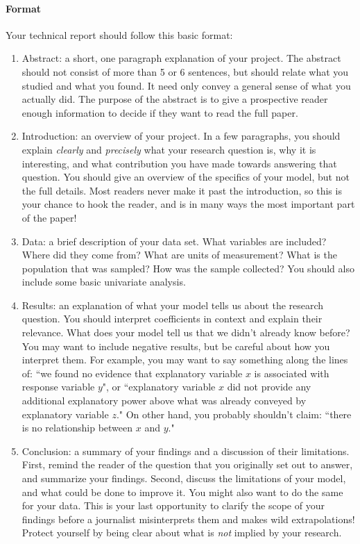 \documentclass[10pt]{article}
\begin{document}
\paragraph{Format}
Your technical report should follow this basic format:
	\begin{enumerate}
		\item Abstract: a short, one paragraph explanation of your project. The abstract should not consist of more than 5 or 6 sentences, but should relate what you studied and what you found. It need only convey a general sense of what you actually did. The purpose of the abstract is to give a prospective reader enough information to decide if they want to read the full paper. 
		\item Introduction: an overview of your project. In a few paragraphs, you should explain \emph{clearly} and \emph{precisely} what your research question is, why it is interesting, and what contribution you have made towards answering that question. You should give an overview of the specifics of your model, but not the full details. Most readers never make it past the introduction, so this is your chance to hook the reader, and is in many ways the most important part of the paper!
		\item Data: a brief description of your data set. What variables are included? Where did they come from? What are units of measurement? What is the population that was sampled? How was the sample collected? You should also include some basic univariate analysis. 
		\item Results: an explanation of what your model tells us about the research question. You should interpret coefficients in context and explain their relevance. What does your model tell us that we didn't already know before? You may want to include negative results, but be careful about how you interpret them. For example, you may want to say something along the lines of: ``we found no evidence that explanatory variable $x$ is associated with response variable $y$", or ``explanatory variable $x$ did not provide any additional explanatory power above what was already conveyed by explanatory variable $z$." On other hand, you probably shouldn't claim: ``there is no relationship between $x$ and $y$."
		\item Conclusion: a summary of your findings and a discussion of their limitations. First, remind the reader of the question that you originally set out to answer, and summarize your findings. Second, discuss the limitations of your model, and what could be done to improve it. You might also want to do the same for your data. This is your last opportunity to clarify the scope of your findings before a journalist misinterprets them and makes wild extrapolations! Protect yourself by being clear about what is \emph{not} implied by your research.
	\end{enumerate}
\end{document}
